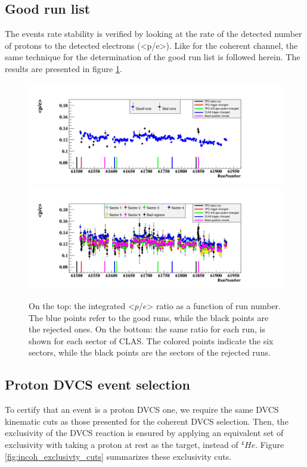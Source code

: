 \subsection{Good run list}
The events rate stability is verified by looking at the rate of the 
detected number of protons to the detected electrons (<p/e>). Like for the 
coherent channel, the same technique for the determination of the good run list 
is followed herein. The results are presented in figure 
\ref{fig:prot_over_e_Run_sec.png}.  \begin{figure}[h!]
\includegraphics[scale=0.4]{fig_dvcs/prot_over_e_Run.png}
\includegraphics[scale=0.4]{fig_dvcs/prot_over_e_Run_sec.png}
\caption{On the top: the integrated <$p/e$> ratio as a function of run number.  
   The blue points refer to the good runs, while the black points are the 
rejected ones. On the bottom: the same ratio for each run, is shown for each 
sector of CLAS. The colored points indicate the six sectors, while the black 
points are the sectors of the rejected runs. } 
\label{fig:prot_over_e_Run_sec.png}
\end{figure}


\subsection{Proton DVCS event selection}
To certify that an event is a proton DVCS one, we require the same DVCS 
kinematic cuts as those presented for the coherent DVCS selection. Then, the 
exclusivity of the DVCS reaction is ensured by applying an equivalent set of 
exclusivity with taking a proton at rest as the target, instead of $^4He$.  
Figure \ref{fig:incoh_exclusivty_cuts} summarizes these exclusivity cuts.

